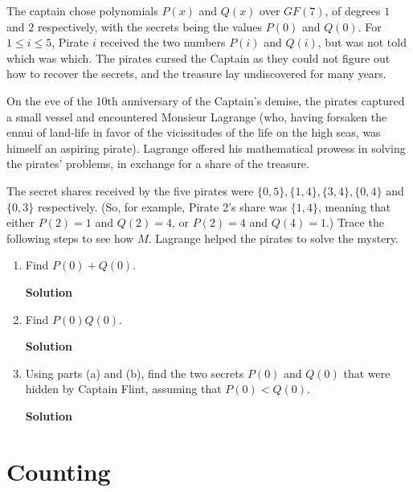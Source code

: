 \documentclass{article}\usepackage{amsmath,amssymb,amsthm,tikz,tkz-graph,color,chngpage,soul,hyperref,csquotes,graphicx,floatrow}\newcommand*{\QEDB}{\hfill\ensuremath{\square}}\newtheorem*{prop}{Proposition}\renewcommand{\theenumi}{\alph{enumi}}\usepackage[shortlabels]{enumitem}\usepackage[nobreak=true]{mdframed}\usetikzlibrary{matrix,calc}\MakeOuterQuote{"}\usepackage[margin=0.75in]{geometry} \newtheorem{theorem}{Theorem}
\begin{document}
\vspace{3mm}
\noindent The captain chose polynomials $P(x)$ and $Q(x)$ over $GF(7)$, of degrees $1$ and $2$ respectively, with the secrets being the values $P(0)$ and $Q(0)$. For $1 \leqslant i \leqslant 5$, Pirate $i$ received the two numbers $P(i)$ and $Q(i)$, but was not told which was which. The pirates cursed the Captain as they could not figure out how to recover the secrets, and the treasure lay undiscovered for many years.

\vspace{3mm}
\noindent On the eve of the 10th anniversary of the Captain's demise, the pirates captured a small vessel and encountered Monsieur Lagrange (who, having forsaken the ennui of land-life in favor of the vicissitudes of the life on the high seas, was himself an aspiring pirate). Lagrange offered his mathematical prowess in solving the pirates' problems, in exchange for a share of the treasure.

\vspace{3mm}
\noindent The secret shares received by the five pirates were $\{0, 5\}, \{1, 4\}, \{3, 4\}, \{0, 4\}$ and $\{0, 3\}$ respectively. (So, for example, Pirate 2's share was $\{1, 4\}$, meaning that either $P(2) = 1$ and $Q(2) = 4$, or $P(2) = 4$ and $Q(4) = 1$.) Trace the following steps to see how $M$. Lagrange helped the pirates to solve the mystery.
\begin{enumerate}
\item Find $P(0)+Q(0)$.
\begin{mdframed}
\textbf{Solution}

\end{mdframed}
\item Find $P(0)Q(0)$.
\begin{mdframed}
\textbf{Solution}

\end{mdframed}
\item Using parts (a) and (b), find the two secrets $P(0)$ and $Q(0)$ that were hidden by Captain Flint, assuming that $P(0)<Q(0)$.
\begin{mdframed}
\textbf{Solution}

\end{mdframed}
\end{enumerate}
\clearpage

\section*{Counting}
\end{document}
